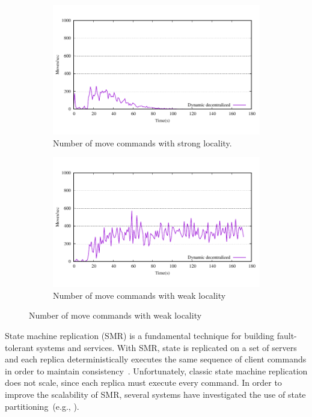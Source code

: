 \begin{figure}[ht!]
\begin{subfigure}[b]{0.45\textwidth}
    \includegraphics[width=0.95\columnwidth]{figures/motivation-moves-strong-locality}
    \caption{Number of move commands with strong locality.}
  \end{subfigure}
  \begin{subfigure}[b]{0.45\textwidth}
    \centering
    \includegraphics[width=0.95\columnwidth]{figures/motivation-moves-weak-locality}
    \caption{Number of move commands with weak locality}
  \end{subfigure} 
\end{figure}




State machine replication (SMR) is a fundamental technique for
building fault-tolerant systems and services. With SMR, state is
replicated on a set of servers and each replica deterministically
executes the same sequence of client commands in order to maintain
consistency~\cite{Lam78,Sch90}. Unfortunately, classic state machine replication does not
scale, since each replica must execute every command. In order to
improve the scalability of SMR, several systems have investigated the
use of state partitioning~(e.g., \cite{corbett2013spanner, bezerra2014ssmr,Glendenning:2011kj,
  Aguilera:2007,bli16edcc}).

